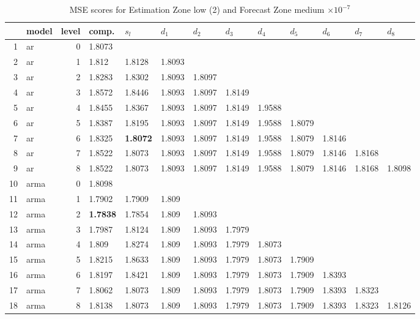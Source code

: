 \documentclass[10pt,a4paper]{article}
\begin{document}
\begin{table}[ht]
\centering
\caption{MSE scores for Estimation Zone low (2) and Forecast Zone medium $ \times 10^{-7}$} 
\begin{tabular}{rlrllllllllll}
  \hline
 & model & level & comp. & $s_l$ & $d_1$ & $d_2$ & $d_3$ & $d_4$ & $d_5$ & $d_6$ & $d_7$ & $d_8$ \\ 
  \hline
1 & ar &     0 & 1.8073 &  &  &  &  &  &  &  &  &  \\ 
  2 & ar &     1 & 1.812 & 1.8128 & 1.8093 &  &  &  &  &  &  &  \\ 
  3 & ar &     2 & 1.8283 & 1.8302 & 1.8093 & 1.8097 &  &  &  &  &  &  \\ 
  4 & ar &     3 & 1.8572 & 1.8446 & 1.8093 & 1.8097 & 1.8149 &  &  &  &  &  \\ 
  5 & ar &     4 & 1.8455 & 1.8367 & 1.8093 & 1.8097 & 1.8149 & 1.9588 &  &  &  &  \\ 
  6 & ar &     5 & 1.8387 & 1.8195 & 1.8093 & 1.8097 & 1.8149 & 1.9588 & 1.8079 &  &  &  \\ 
  7 & ar &     6 & 1.8325 & \textbf{1.8072} & 1.8093 & 1.8097 & 1.8149 & 1.9588 & 1.8079 & 1.8146 &  &  \\ 
  8 & ar &     7 & 1.8522 & 1.8073 & 1.8093 & 1.8097 & 1.8149 & 1.9588 & 1.8079 & 1.8146 & 1.8168 &  \\ 
  9 & ar &     8 & 1.8522 & 1.8073 & 1.8093 & 1.8097 & 1.8149 & 1.9588 & 1.8079 & 1.8146 & 1.8168 & 1.8098 \\ 
   \hline
10 & arma &     0 & 1.8098 &  &  &  &  &  &  &  &  &  \\ 
  11 & arma &     1 & 1.7902 & 1.7909 & 1.809 &  &  &  &  &  &  &  \\ 
  12 & arma &     2 & \textbf{1.7838} & 1.7854 & 1.809 & 1.8093 &  &  &  &  &  &  \\ 
  13 & arma &     3 & 1.7987 & 1.8124 & 1.809 & 1.8093 & 1.7979 &  &  &  &  &  \\ 
  14 & arma &     4 & 1.809 & 1.8274 & 1.809 & 1.8093 & 1.7979 & 1.8073 &  &  &  &  \\ 
  15 & arma &     5 & 1.8215 & 1.8633 & 1.809 & 1.8093 & 1.7979 & 1.8073 & 1.7909 &  &  &  \\ 
  16 & arma &     6 & 1.8197 & 1.8421 & 1.809 & 1.8093 & 1.7979 & 1.8073 & 1.7909 & 1.8393 &  &  \\ 
  17 & arma &     7 & 1.8062 & 1.8073 & 1.809 & 1.8093 & 1.7979 & 1.8073 & 1.7909 & 1.8393 & 1.8323 &  \\ 
  18 & arma &     8 & 1.8138 & 1.8073 & 1.809 & 1.8093 & 1.7979 & 1.8073 & 1.7909 & 1.8393 & 1.8323 & 1.8126 \\ 

\end{tabular}
\end{table}
\end{document}
